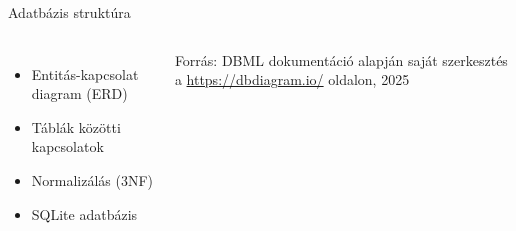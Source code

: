\documentclass[11pt]{beamer}
\begin{document}
\begin{frame}{Adatbázis struktúra}
    \vspace{-1em}
    \begin{columns}[t]
        \begin{itemize}
            \vspace{1em}
            \item Entitás-kapcsolat diagram (ERD)
            \vspace{1em}
            \item Táblák közötti kapcsolatok
            \vspace{1em}
            \item Normalizálás (3NF)
            \vspace{1em}
            \item SQLite adatbázis
        \end{itemize}
        
        \vspace{3em}
        \scriptsize
        Forrás: \textsc{DBML} dokumentáció alapján saját szerkesztés a \url{https://dbdiagram.io/} oldalon, 2025
        

\end{columns}
\end{frame}
\end{document}
